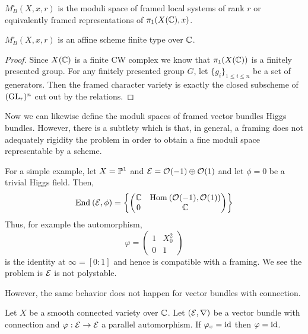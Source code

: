 \documentclass[12pt]{article}
\begin{document}
\begin{defn}
$M_B^{\square}(X, x, r)$ is the moduli space of framed local systems of rank $r$ or equivalently framed representations of $\pi_1(X(\CC), x)$.
\end{defn}

\begin{prop}
$M_B^{\square}(X, x, r)$ is an affine scheme finite type over $\CC$.
\end{prop}

\begin{proof}
Since $X(\CC)$ is a finite CW complex we know that $\pi_1(X(\CC))$ is a finitely presented group. For any finitely presented group $G$, let $\{ g_i \}_{1 \le i \le n}$ be a set of generators. Then the framed character variety is exactly the closed subscheme of $(\GL_r)^n$ cut out by the relations. 
\end{proof}

Now we can likewise define the moduli spaces of framed vector bundles Higgs bundles. However, there is a subtlety which is that, in general, a framing does not adequately rigidity the problem in order to obtain a fine moduli space representable by a scheme.

\begin{example}
For a simple example, let $X = \P^1$ and $\E = \struct{}(-1) \oplus \struct{}(1)$ and let $\phi = 0$ be a trivial Higgs field. Then,
\[ \End{\E, \phi} = \left \{ \begin{pmatrix}
\CC & \Hom{}{\struct{}(-1)}{\struct{}(1)}
\\
0 & \CC
\end{pmatrix} \right\} \]
Thus, for example the automorphism,
\[ \varphi = \begin{pmatrix}
1 & X^2_0
\\
0 & 1
\end{pmatrix} \]
is the identity at $\infty = [0 : 1]$ and hence is compatible with a framing. We see the problem is $\E$ is not polystable.
\end{example}

However, the same behavior does not happen for vector bundles with connection.

\begin{prop}
Let $X$ be a smooth connected variety over $\CC$. Let $(\E, \nabla)$ be a vector bundle with connection and $\varphi : \E \to \E$ a parallel automorphism. If $\varphi_x = \id$ then $\varphi = \id$.
\end{prop}
\end{document}
